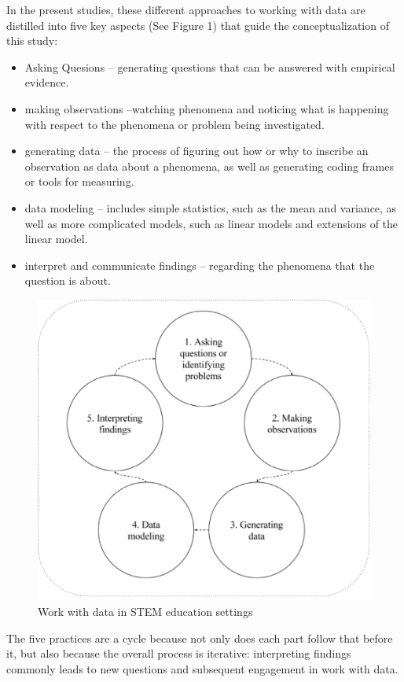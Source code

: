 \documentclass[]{book}
\providecommand{\tightlist}{%
  \setlength{\itemsep}{0pt}\setlength{\parskip}{0pt}}
\theoremstyle{definition}
\theoremstyle{definition}
\theoremstyle{definition}
\theoremstyle{remark}
\begin{document}
In the present studies, these different approaches to working with data
are distilled into five key aspects (See Figure 1) that guide the
conceptualization of this study:

\begin{itemize}
\tightlist
\item
  Asking Quesions -- generating questions that can be answered with
  empirical evidence.
\item
  making observations --watching phenomena and noticing what is
  happening with respect to the phenomena or problem being investigated.
\item
  generating data -- the process of figuring out how or why to inscribe
  an observation as data about a phenomena, as well as generating coding
  frames or tools for measuring.
\item
  data modeling -- includes simple statistics, such as the mean and
  variance, as well as more complicated models, such as linear models
  and extensions of the linear model.
\item
  interpret and communicate findings -- regarding the phenomena that the
  question is about.
\end{itemize}

\begin{figure}

{\centering \includegraphics[width=0.8\linewidth]{images/figure1} 

}

\caption{Work with data in STEM education settings}\label{fig:unnamed-chunk-1}
\end{figure}

The five practices are a cycle because not only does each part follow
that before it, but also because the overall process is iterative:
interpreting findings commonly leads to new questions and subsequent
engagement in work with data.
\end{document}
